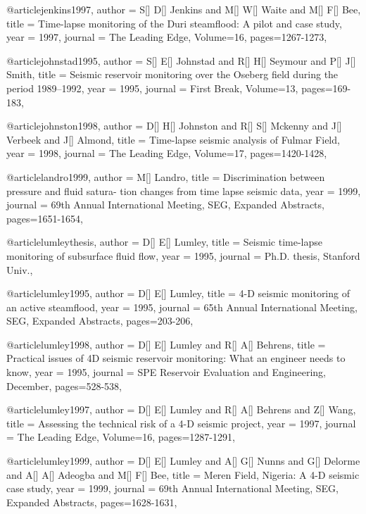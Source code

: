 @article{jenkins1997,
  author =	 {S[] D[] Jenkins and M[] W[] Waite and M[] F[] Bee},
  title =	 {Time-lapse monitoring of the Duri steamflood: A pilot and case study},
  year =	 1997,
  journal =	 {The Leading Edge},
    Volume=16,
 pages=1267-1273,
}


@article{johnstad1995,
  author =	 {S[] E[] Johnstad and R[] H[] Seymour and P[] J[] Smith},
  title =	 { Seismic reservoir monitoring over the Oseberg field during the period 1989–1992},
  year =	 1995,
  journal =	 {First Break},
    Volume=13,
 pages=169-183,
}


@article{johnston1998,
  author =	 {D[] H[] Johnston and R[] S[] Mckenny and J[] Verbeek and J[] Almond},
  title =	 {Time-lapse seismic analysis of Fulmar Field},
  year =	 1998,
  journal =	 {The Leading Edge},
    Volume=17,
 pages=1420-1428,
}

@article{landro1999,
  author =	 {M[] Landro},
  title =	 {Discrimination between pressure and fluid satura-
tion changes from time lapse seismic data},
  year =	 1999,
  journal =	 {69th Annual International Meeting, SEG, Expanded Abstracts},
 pages=1651-1654,
}

@article{lumleythesis,
  author =	 {D[] E[] Lumley},
  title =	 {Seismic time-lapse monitoring of subsurface fluid
flow},
  year =	 1995,
  journal =	 {Ph.D. thesis, Stanford Univ.},
}

@article{lumley1995,
  author =	 {D[] E[] Lumley},
  title =	 { 4-D seismic monitoring of an active steamflood},
  year =	 1995,
  journal =	 {65th Annual International Meeting, SEG, Expanded Abstracts},
 pages=203-206,
}

@article{lumley1998,
  author =	 {D[] E[] Lumley and R[] A[] Behrens},
  title =	 { Practical issues of 4D seismic reservoir monitoring: What an engineer needs to know},
  year =	 1995,
  journal =	 {SPE Reservoir Evaluation and Engineering, December},
 pages=528-538,
}

@article{lumley1997,
  author =	 {D[] E[] Lumley and R[] A[] Behrens and Z[] Wang},
  title =	 {Assessing the technical risk of a 4-D seismic project},
  year =	 1997,
  journal =	 {The Leading Edge},
    Volume=16,
 pages=1287-1291,
}

@article{lumley1999,
  author =	 {D[] E[] Lumley and A[] G[] Nunns and G[] Delorme and A[] A[] Adeogba and M[] F[] Bee},
  title =	 {Meren Field, Nigeria: A 4-D seismic case study},
  year =	 1999,
  journal =	 {69th Annual International Meeting, SEG, Expanded Abstracts},
 pages=1628-1631,
}


